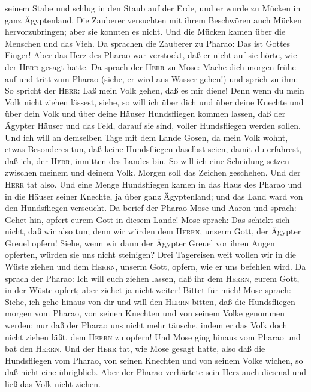 seinem Stabe und schlug in den Staub auf der Erde, und er wurde zu
Mücken in ganz Ägyptenland.  Die Zauberer versuchten mit
ihrem Beschwören auch Mücken hervorzubringen; aber sie konnten es nicht.
Und die Mücken kamen über die Menschen und das Vieh.  Da
sprachen die Zauberer zu Pharao: Das ist Gottes Finger! Aber das Herz
des Pharao war verstockt, daß er nicht auf sie hörte, wie der
\textsc{Herr} gesagt hatte.  Da sprach der \textsc{Herr}
zu Mose: Mache dich morgen frühe auf und tritt zum Pharao (siehe, er
wird ans Wasser gehen!) und sprich zu ihm: So spricht der \textsc{Herr}:
Laß mein Volk gehen, daß es mir diene!  Denn wenn du mein
Volk nicht ziehen lässest, siehe, so will ich über dich und über deine
Knechte und über dein Volk und über deine Häuser Hundsfliegen kommen
lassen, daß der Ägypter Häuser und das Feld, darauf sie sind, voller
Hundsfliegen werden sollen.  Und ich will an demselben
Tage mit dem Lande Gosen, da mein Volk wohnt, etwas Besonderes tun, daß
keine Hundsfliegen daselbst seien, damit du erfahrest, daß ich, der
\textsc{Herr}, inmitten des Landes bin.  So will ich eine
Scheidung setzen zwischen meinem und deinem Volk. Morgen soll das
Zeichen geschehen.  Und der \textsc{Herr} tat also. Und
eine Menge Hundsfliegen kamen in das Haus des Pharao und in die Häuser
seiner Knechte, ja über ganz Ägyptenland; und das Land ward von den
Hundsfliegen verseucht.  Da berief der Pharao Mose und
Aaron und sprach: Gehet hin, opfert eurem Gott in diesem Lande!
 Mose sprach: Das schickt sich nicht, daß wir also tun;
denn wir würden dem \textsc{Herrn}, unserm Gott, der Ägypter Greuel
opfern! Siehe, wenn wir dann der Ägypter Greuel vor ihren Augen
opferten, würden sie uns nicht steinigen?  Drei
Tagereisen weit wollen wir in die Wüste ziehen und dem \textsc{Herrn},
unserm Gott, opfern, wie er uns befehlen wird.  Da sprach
der Pharao: Ich will euch ziehen lassen, daß ihr dem \textsc{Herrn},
eurem Gott, in der Wüste opfert; aber ziehet ja nicht weiter! Bittet für
mich!  Mose sprach: Siehe, ich gehe hinaus von dir und
will den \textsc{Herrn} bitten, daß die Hundsfliegen morgen vom Pharao,
von seinen Knechten und von seinem Volke genommen werden; nur daß der
Pharao uns nicht mehr täusche, indem er das Volk doch nicht ziehen läßt,
dem \textsc{Herrn} zu opfern!  Und Mose ging hinaus vom
Pharao und bat den \textsc{Herrn}.  Und der \textsc{Herr}
tat, wie Mose gesagt hatte, also daß die Hundsfliegen vom Pharao, von
seinen Knechten und von seinem Volke wichen, so daß nicht eine
übrigblieb.  Aber der Pharao verhärtete sein Herz auch
diesmal und ließ das Volk nicht ziehen.


